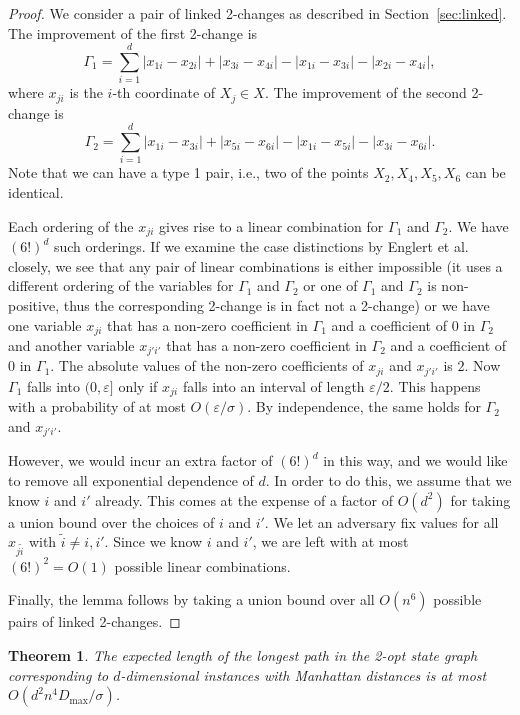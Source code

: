 \documentclass[11pt,DIV=12,a4paper]{scrartcl}
\newtheorem{theorem}[claim]{Theorem}
\newcommand{\eps}{\varepsilon}
\newcommand{\maxx}{D_{\max}}
\begin{document}
\begin{proof}
We consider a pair of linked 2-changes as described in Section~\ref{sec:linked}.
The improvement of the first 2-change is
\[
  \Gamma_1 = \sum_{i=1}^d | x_{1i} - x_{2i}| + | x_{3i} - x_{4i}| - | x_{1i} - x_{3i}| - | x_{2i} - x_{4i}|,
\]
where $x_{ji}$ is the $i$-th coordinate of $X_j \in X$.
The improvement of the second 2-change is
\[
  \Gamma_2 = \sum_{i=1}^d | x_{1i} - x_{3i}| + | x_{5i} - x_{6i}| - | x_{1i} - x_{5i}| - | x_{3i} - x_{6i}|.
\]
Note that we can have a type 1 pair, i.e., two of the points $X_2, X_4, X_5, X_6$ can be identical.

Each ordering of the $x_{ji}$ gives rise to a linear combination for $\Gamma_1$ and $\Gamma_2$. We have $(6!)^d$ such orderings.
If we examine the case distinctions by Englert et al.~\cite[Lemmas 11, 12, 13]{EnglertEA:2Opt:2014} closely,
we see that any pair of linear combinations is either impossible (it uses a different ordering of the variables for
$\Gamma_1$ and $\Gamma_2$ or one of $\Gamma_1$ and $\Gamma_2$ is non-positive, thus the corresponding
2-change is in fact not a 2-change)
or we have one variable $x_{ji}$ that has a non-zero coefficient in $\Gamma_1$ and a coefficient of $0$
in $\Gamma_2$ and another variable $x_{j'i'}$ that has 
a non-zero coefficient in $\Gamma_2$ and a coefficient of $0$
in $\Gamma_1$. The absolute values of the non-zero coefficients of $x_{ji}$
and $x_{j'i'}$ is $2$.
Now $\Gamma_1$ falls into $(0,\eps]$ only if $x_{ji}$ falls into an interval
of length $\eps/2$. This happens with a probability of at most $O(\eps/\sigma)$.
By independence, the same holds for $\Gamma_2$ and $x_{j'i'}$.

However, we would incur an extra factor of $(6!)^d$ in this way, and we would like to remove all exponential dependence of $d$.
In order to do this, we assume that we know $i$ and $i'$ already. This comes at the expense of a factor of $O(d^2)$ for taking
a union bound over the choices of $i$ and $i'$. We let an adversary fix values for all $x_{j \tilde i}$ with $\tilde i \neq i, i'$.
Since we know $i$ and $i'$, we are left with at most $(6!)^2 = O(1)$ possible linear combinations.

Finally, the lemma follows by taking a union bound over all $O(n^6)$ possible pairs of linked 2-changes.
\end{proof}

\begin{theorem}
\label{thm:manhattan}
The expected length of the longest path in the 2-opt state graph corresponding to $d$-dimensional instances
with Manhattan distances is at most $O(d^2 n^4 \maxx/\sigma)$.
\end{theorem}
\end{document}
